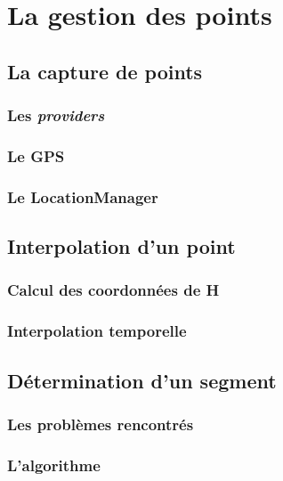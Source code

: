 \chapter{La gestion des points}

\section{La capture de points}
\subsection{Les \textit{providers}}
\subsection{Le GPS}
\subsection{Le LocationManager}

\section{Interpolation d'un point}
\subsection{Calcul des coordonnées de H}
\subsection{Interpolation temporelle}

\section{Détermination d'un segment}
\subsection{Les problèmes rencontrés}
\subsection{L'algorithme}